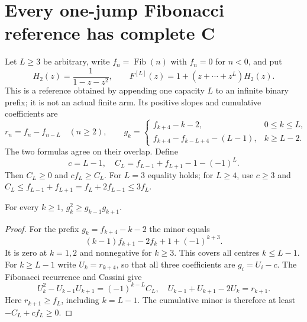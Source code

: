 \section{Every one-jump Fibonacci reference has complete C}
Let $L\ge3$ be arbitrary, write $f_n=\operatorname{Fib}(n)$ with
$f_n=0$ for $n<0$, and put
\[
 H_2(z)=\frac1{1-z-z^2},\qquad
 F^{[L]}(z)=1+(z+\cdots+z^L)H_2(z).
\]
This is a reference obtained by appending one capacity $L$ to an
infinite binary prefix; it is not an actual finite arm.  Its positive
slopes and cumulative coefficients are
\[
 r_n=f_n-f_{n-L}\quad(n\ge2),\qquad
 g_k=\begin{cases}f_{k+4}-k-2,&0\le k\le L,\\
 f_{k+4}-f_{k-L+4}-(L-1),&k\ge L-2.
 \end{cases}                                               \tag{6}
\]
The two formulas agree on their overlap.  Define
\[
 c=L-1,\quad C_L=f_{L-1}+f_{L+1}-1-(-1)^L.
\]
Then $C_L\ge0$ and $cf_L\ge C_L$.  For $L=3$ equality holds;
for $L\ge4$, use $c\ge3$ and
$C_L\le f_{L-1}+f_{L+1}=f_L+2f_{L-1}\le3f_L$.

\begin{lemma}
For every $k\ge1$, $g_k^2\ge g_{k-1}g_{k+1}$.
\end{lemma}
\begin{proof}
For the prefix $g_k=f_{k+4}-k-2$ the minor equals
\[
 (k-1)f_{k+1}-2f_k+1+(-1)^{k+3}.                           \tag{7}
\]
It is zero at $k=1,2$ and nonnegative for $k\ge3$.
This covers all centres $k\le L-1$.
For $k\ge L-1$ write $U_k=r_{k+4}$, so that all three
coefficients are $g_i=U_i-c$.  The Fibonacci recurrence and Cassini give
\[
 U_k^2-U_{k-1}U_{k+1}=(-1)^{k-L}C_L,
 \quad U_{k-1}+U_{k+1}-2U_k=r_{k+1}.
\]
Here $r_{k+1}\ge f_L$, including $k=L-1$.
The cumulative minor is therefore at least $-C_L+cf_L\ge0$.
\end{proof}

